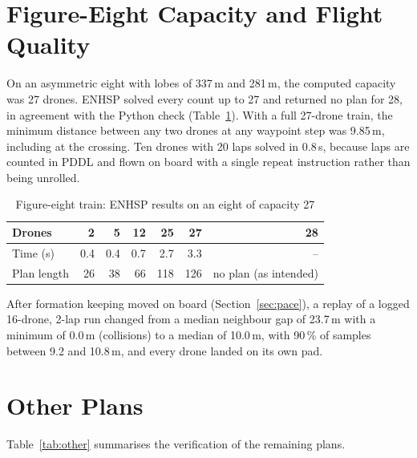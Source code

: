 \documentclass[11pt,a4paper,oneside]{report}
\begin{document}
\section{Figure-Eight Capacity and Flight Quality}
On an asymmetric eight with lobes of 337\,m and 281\,m, the computed capacity was 27 drones. ENHSP
solved every count up to 27 and returned no plan for 28, in agreement with the Python check
(Table~\ref{tab:fig8}). With a full 27-drone train, the minimum distance between any two drones at
any waypoint step was 9.85\,m, including at the crossing. Ten drones with 20 laps solved in 0.8\,s,
because laps are counted in PDDL and flown on board with a single repeat instruction rather than
being unrolled.

\begin{table}[H]
\caption{Figure-eight train: ENHSP results on an eight of capacity 27}\label{tab:fig8}
\small
\begin{tabular*}{\textwidth}{@{\extracolsep{\fill}}lrrrrrr@{}}
\toprule
\textbf{Drones} & 2 & 5 & 12 & 25 & 27 & 28 \\
\midrule
Time (s) & 0.4 & 0.4 & 0.7 & 2.7 & 3.3 & -- \\
Plan length & 26 & 38 & 66 & 118 & 126 & no plan (as intended) \\
\bottomrule
\end{tabular*}
\end{table}

\noindent After formation keeping moved on board (Section~\ref{sec:pace}), a replay of a logged
16-drone, 2-lap run changed from a median neighbour gap of 23.7\,m with a minimum of 0.0\,m
(collisions) to a median of 10.0\,m, with 90\,\% of samples between 9.2 and 10.8\,m, and every
drone landed on its own pad.

\section{Other Plans}
Table~\ref{tab:other} summarises the verification of the remaining plans.
\end{document}
